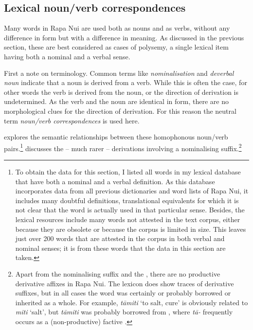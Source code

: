 \subsection{Lexical noun/verb correspondences}\label{sec:3.2.2}
Many words in Rapa Nui are used both as nouns and as verbs, without any difference in form but with a difference in meaning. As discussed in the previous section, these are best considered as cases of polysemy, a single lexical item having both a nominal and a verbal sense. 

First a note on terminology. Common terms like \textit{nominalisation} and \textit{deverbal noun} indicate that a noun is derived from a verb. While this is often the case, for other words the verb is derived from the noun, or the direction of derivation is undetermined. As the verb and the noun are identical in form, there are no morphological clues for the direction of derivation. For this reason the neutral term \textit{noun/verb correspondences} is used here. 

\newpage 
{} explores the semantic relationships between these homophonous noun/verb pairs.\footnote{\label{fn:98}To obtain the data for this section, I listed all words in my lexical database that have both a nominal and a verbal definition. As this database incorporates data from all previous dictionaries and word lists of Rapa Nui, it includes many doubtful definitions, translational equivalents for which it is not clear that the word is actually used in that particular sense. Besides, the lexical resources include many words not attested in the text corpus, either because they are obsolete or because the corpus is limited in size. This leaves just over 200 words that are attested in the corpus in both verbal and nominal senses; it is from these words that the data in this section are taken.}  discusses the – much rarer – derivations involving a nominalising suffix.\footnote{\label{fn:99}Apart from the nominalising suffix and the  , there are no productive derivative affixes in Rapa Nui. The lexicon does show traces of derivative suffixes, but in all cases the word was certainly or probably borrowed or inherited as a whole. For example, \textit{tāmiti} ‘to salt, cure’ is obviously related to \textit{miti} ‘salt’, but \textit{tāmiti} was probably borrowed from , where \textit{tā-} frequently occurs as a (non-productive) factive .} 

